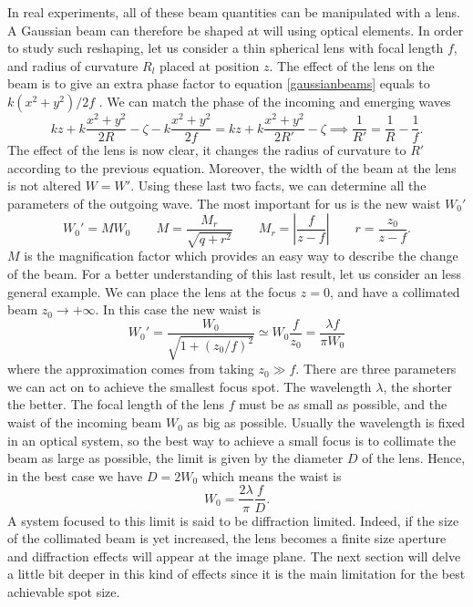 In real experiments, all of these beam quantities can be manipulated with a lens. A Gaussian beam can therefore be shaped at will using optical elements. In order to study such reshaping, let us consider a thin spherical lens with focal length $f$, and radius of curvature $R_l$ placed at position $z$. The effect of the lens on the beam is to give an extra phase factor to equation \eqref{gaussianbeams} equals to $k(x^2 + y^2)/2f$ \cite{beamparameters}. We can match the phase of the incoming and emerging waves
\begin{equation}
kz +k \frac{x^2+y^2}{2R} - \zeta  - k\frac{x^2 + y^2}{2f} = kz + k \frac{x^2+y^2}{2R'} - \zeta \implies \frac{1}{R'} = \frac{1}{R} - \frac{1}{f}.
\end{equation}
The effect of the lens is now clear, it changes the radius of curvature to $R'$ according to the previous equation. Moreover, the width of the beam at the lens is not altered $W=W'$. Using these last two facts, we can determine all the parameters of the outgoing wave. The most important for us is the new waist $W_0'$
\begin{equation}
W_0' = MW_0 \qquad M = \frac{M_r}{\sqrt{q+r^2}} \qquad M_r = \left|\frac{f}{z-f}\right| \qquad r = \frac{z_0}{z-f}.
\end{equation}
$M$ is the magnification factor which provides an easy way to describe the change of the beam. For a better understanding of this last result, let us consider an less general example. We can place the lens at the focus $z=0$, and have a collimated beam $z_0 \to +\infty $. In this case the new waist is
\begin{equation}
W_0' = \frac{W_0}{\sqrt{1 + (z_0/f)^2}} \simeq W_0\frac{f}{z_0} = \frac{\lambda f}{\pi W_0}
\end{equation}
where the approximation comes from taking $z_0\gg f$. There are three parameters we can act on to achieve the smallest focus spot. The wavelength $\lambda$, the shorter the better. The focal length of the lens $f$ must be as small as possible, and the waist of the incoming beam $W_0$ as big as possible. Usually the wavelength is fixed in an optical system, so the best way to achieve a small focus is to collimate the beam as large as possible, the limit is given by the diameter $D$ of the lens. Hence, in the best case we have $D = 2W_0$ which means the waist is
\begin{equation}
W_0 = \frac{2\lambda}{\pi} \frac{f}{D}.
\end{equation}
A system focused to this limit is said to be diffraction limited. Indeed, if the size of the collimated beam is yet increased, the lens becomes a finite size aperture and diffraction effects will appear at the image plane. The next section will delve a little bit deeper in this kind of effects since it is the main limitation for the best achievable spot size.

